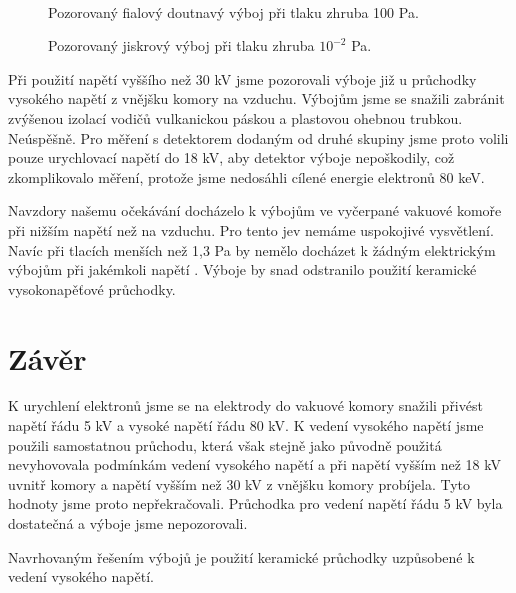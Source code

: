 \begin{figure}[h!]
\begin{minipage}[c]{200pt}
\end{minipage}
\\
\begin{minipage}[c]{200pt}
\caption{Pozorovaný fialový doutnavý výboj při tlaku zhruba 100 Pa.  }
\label{obr:fialovy_vyboj}
\end{minipage}
\begin{minipage}[c]{5pt}
\end{minipage}
\begin{minipage}[c]{200pt}
\caption{Pozorovaný jiskrový výboj při tlaku zhruba $10^{-2}$ Pa.}
\label{obr:jiskra}
\end{minipage}
\end{figure}


\par Při použití napětí vyššího než 30 kV jsme pozorovali výboje již u průchodky vysokého napětí z vnějšku komory na vzduchu. Výbojům jsme se snažili zabránit zvýšenou izolací vodičů vulkanickou páskou a plastovou ohebnou trubkou. Neúspěšně. Pro měření s detektorem dodaným od druhé skupiny jsme proto volili pouze urychlovací napětí do 18 kV, aby detektor výboje nepoškodily, což zkomplikovalo měření, protože jsme nedosáhli cílené energie elektronů 80 keV.
\par Navzdory našemu očekávání docházelo k výbojům ve vyčerpané vakuové komoře při nižším napětí než na vzduchu. Pro tento jev nemáme uspokojivé vysvětlení. Navíc při tlacích menších než 1,3 Pa by nemělo docházet k žádným elektrickým výbojům při jakémkoli napětí \cite{ellion}. Výboje by snad odstranilo použití keramické vysokonapěťové průchodky.




\section{Závěr}
\par K urychlení elektronů jsme se na elektrody do vakuové komory snažili přivést napětí řádu 5 kV a vysoké napětí řádu 80 kV. K vedení vysokého napětí jsme použili samostatnou průchodu, která však stejně jako původně použitá nevyhovovala podmínkám vedení vysokého napětí a při napětí vyšším než 18 kV uvnitř komory a napětí vyšším než 30 kV z vnějšku komory probíjela. Tyto hodnoty jsme proto nepřekračovali. Průchodka pro vedení napětí řádu 5 kV byla dostatečná a výboje jsme nepozorovali.
\par Navrhovaným řešením výbojů je použití keramické průchodky uzpůsobené k vedení vysokého napětí.